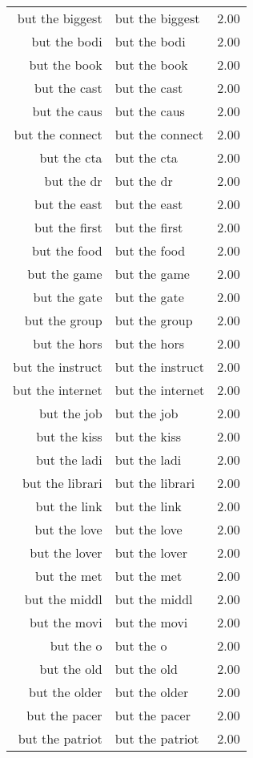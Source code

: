 \begin{table}[ht]
\begin{tabular}{rlr}
  but the biggest & but the biggest & 2.00 \\ 
  but the bodi & but the bodi & 2.00 \\ 
  but the book & but the book & 2.00 \\ 
  but the cast & but the cast & 2.00 \\ 
  but the caus & but the caus & 2.00 \\ 
  but the connect & but the connect & 2.00 \\ 
  but the cta & but the cta & 2.00 \\ 
  but the dr & but the dr & 2.00 \\ 
  but the east & but the east & 2.00 \\ 
  but the first & but the first & 2.00 \\ 
  but the food & but the food & 2.00 \\ 
  but the game & but the game & 2.00 \\ 
  but the gate & but the gate & 2.00 \\ 
  but the group & but the group & 2.00 \\ 
  but the hors & but the hors & 2.00 \\ 
  but the instruct & but the instruct & 2.00 \\ 
  but the internet & but the internet & 2.00 \\ 
  but the job & but the job & 2.00 \\ 
  but the kiss & but the kiss & 2.00 \\ 
  but the ladi & but the ladi & 2.00 \\ 
  but the librari & but the librari & 2.00 \\ 
  but the link & but the link & 2.00 \\ 
  but the love & but the love & 2.00 \\ 
  but the lover & but the lover & 2.00 \\ 
  but the met & but the met & 2.00 \\ 
  but the middl & but the middl & 2.00 \\ 
  but the movi & but the movi & 2.00 \\ 
  but the o & but the o & 2.00 \\ 
  but the old & but the old & 2.00 \\ 
  but the older & but the older & 2.00 \\ 
  but the pacer & but the pacer & 2.00 \\ 
  but the patriot & but the patriot & 2.00 \\ 

\end{tabular}
\end{table}
